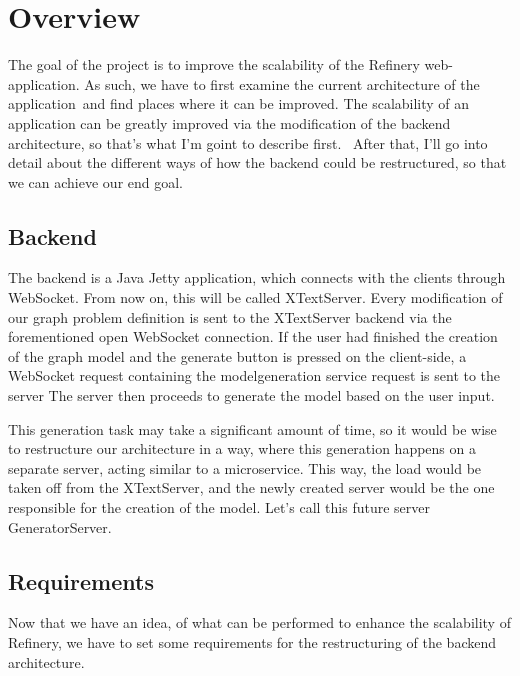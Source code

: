 \chapter{Overview}
The goal of the project is to improve the scalability of the Refinery web-application. As such, we have to first examine the current architecture of the application\
 and find places where it can be improved. The scalability of an application can be greatly improved via the modification of the backend architecture, so that's what I'm goint to describe first. \ 
After that, I'll go into detail about the different ways of how the backend could be restructured, so that we can achieve our end goal. 


\section{Backend}

The backend is a Java Jetty application, which connects with the clients through WebSocket. From now on, this will be called XTextServer. Every modification of our graph problem definition
is sent to the XTextServer backend via the forementioned open WebSocket connection. If the user had finished the creation of the graph model
and the generate button is pressed on the client-side, a WebSocket request containing the modelgeneration service request is sent to the server 
The server then proceeds to generate the model based on the user input.

This generation task may take a significant amount of time, so it would be wise to restructure our architecture in a way, where this generation happens on a separate server,
 acting similar to a microservice. This way, the load would be taken off from 
the XTextServer, and the newly created server would be the one responsible for the creation of the model.
 Let's call this future server GeneratorServer.

\section{Requirements}
Now that we have an idea, of what can be performed to enhance the scalability of Refinery, we have to set some requirements for the
restructuring of the backend architecture. 
